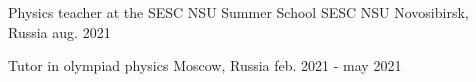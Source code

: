 

\begin{cventries}


    \cventry
    {Physics teacher at the SESC NSU Summer School}
    {SESC NSU}
    {Novosibirsk, Russia}
    {aug. 2021}
    {}


    \cventry
    {Tutor in olympiad physics} %
    {} %
    {Moscow, Russia} %
    {feb. 2021 - may 2021} %
    {}



\end{cventries}
